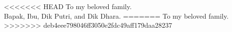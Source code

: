 \thispagestyle{empty}
{}

\vspace*{3cm}

\begin{center}
<<<<<<< HEAD
    To my beloved family.\\
    Bapak, Ibu, Dik Putri, and Dik Dhara.
=======
    To my beloved family.
>>>>>>> deb4eee798046ff3050e2fdc49aff179daa28237
\end{center}